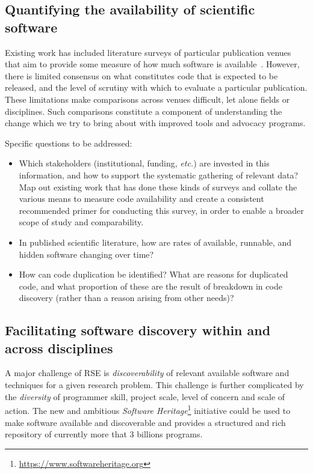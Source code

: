 \documentclass[a4paper,UKenglish]{dagman}
\newcommand{\etc}{\emph{etc.}\xspace}
\begin{document}

\subsection{Quantifying the availability of scientific software}

Existing work has included literature surveys of particular publication venues
that aim to provide some measure of how much software is available~\cite{howison_software_2015,duck_survey_2016,momcheva_software_2015}. However, there is limited consensus on what constitutes code that is expected to be released, and the level of scrutiny with which to evaluate a particular publication. These limitations make comparisons across venues difficult, let alone fields or disciplines. Such comparisons constitute a component of understanding the change which we try to bring about with improved tools and advocacy programs.

Specific questions to be addressed:
\begin{itemize}
\item Which stakeholders (institutional, funding, \etc) are invested in this information, and how to support the systematic gathering of relevant data? Map out existing work that has done these kinds of surveys and collate the various means to measure code availability and create a consistent recommended primer for conducting this survey, in order to enable a broader scope of study and comparability.
\item In published scientific literature, how are rates of available, runnable, and hidden software changing over time?
\item How can code duplication be identified? What are reasons for duplicated code, and what proportion of these are the result of breakdown in code discovery (rather than a reason arising from other needs)?
\end{itemize}

\subsection{Facilitating software discovery within and across disciplines}

A major challenge of RSE is \emph{discoverability} of relevant available software and techniques for
a given research problem. This challenge is further complicated by the \emph{diversity} of
programmer skill, project scale, level of concern and scale of action. The new and ambitious
\textit{Software Heritage}\footnote{\url{https://www.softwareheritage.org}} initiative could be used
to make software available and discoverable and provides a structured and rich repository of
currently more that 3 billions programs. 
\end{document}

